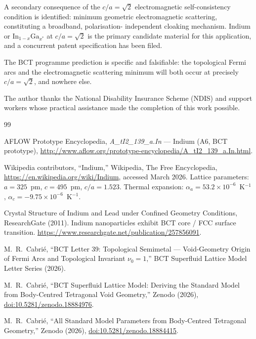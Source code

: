 \documentclass[aps,prl,twocolumn,superscriptaddress,floatfix]{revtex4-2}
\begin{document}
A secondary consequence of the $c/a = \sqrt{2}$ electromagnetic
self-consistency condition is identified: minimum geometric
electromagnetic scattering, constituting a broadband, polarisation-
independent cloaking mechanism.
Indium or $\mathrm{In}_{1-x}\mathrm{Ga}_{x^*}$ at $c/a = \sqrt{2}$
is the primary candidate material for this application, and a
concurrent patent specification has been filed.

The BCT programme prediction is specific and falsifiable:
the topological Fermi arcs and the electromagnetic scattering minimum
will both occur at precisely $c/a = \sqrt{2}$, and nowhere else.

\begin{acknowledgments}
The author thanks the National Disability Insurance Scheme (NDIS)
and support workers whose practical assistance made the completion
of this work possible.
\end{acknowledgments}

\begin{thebibliography}{99}

  AFLOW Prototype Encyclopedia,
  \textit{A\_tI2\_139\_a.In} --- Indium (A6, BCT prototype),
  \url{http://www.aflow.org/prototype-encyclopedia/A_tI2_139_a.In.html}.

  Wikipedia contributors,
  ``Indium,'' Wikipedia, The Free Encyclopedia,
  \url{https://en.wikipedia.org/wiki/Indium},
  accessed March 2026.
  Lattice parameters: $a = 325$~pm, $c = 495$~pm, $c/a = 1.523$.
  Thermal expansion: $\alpha_a = 53.2\times10^{-6}$~K$^{-1}$,
  $\alpha_c = -9.75\times10^{-6}$~K$^{-1}$.

  Crystal Structure of Indium and Lead under Confined Geometry Conditions,
  ResearchGate (2011).
  Indium nanoparticles exhibit BCT core / FCC surface transition.
  \url{https://www.researchgate.net/publication/257856091}.

  M.~R.~Cabri\'{e},
  ``BCT Letter 39: Topological Semimetal --- Void-Geometry Origin of
  Fermi Arcs and Topological Invariant $\nu_0 = 1$,''
  BCT Superfluid Lattice Model Letter Series (2026).

  M.~R.~Cabri\'{e},
  ``BCT Superfluid Lattice Model: Deriving the Standard Model from
  Body-Centred Tetragonal Void Geometry,''
  Zenodo (2026),
  \href{https://doi.org/10.5281/zenodo.18884976}{doi:10.5281/zenodo.18884976}.

  M.~R.~Cabri\'{e},
  ``All Standard Model Parameters from Body-Centred Tetragonal Geometry,''
  Zenodo (2026),
  \href{https://doi.org/10.5281/zenodo.18884415}{doi:10.5281/zenodo.18884415}.

\end{thebibliography}
\end{document}
